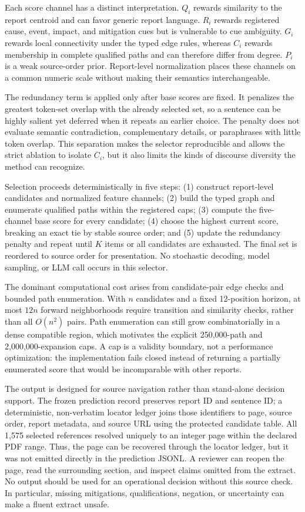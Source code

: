 \documentclass[applsci,article,submit,moreauthors]{Definitions/mdpi}
\begin{document}
Each score channel has a distinct interpretation. $Q_i$ rewards similarity to the report centroid and can favor generic report language. $R_i$ rewards registered cause, event, impact, and mitigation cues but is vulnerable to cue ambiguity. $G_i$ rewards local connectivity under the typed edge rules, whereas $C_i$ rewards membership in complete qualified paths and can therefore differ from degree. $P_i$ is a weak source-order prior. Report-level normalization places these channels on a common numeric scale without making their semantics interchangeable.

The redundancy term is applied only after base scores are fixed. It penalizes the greatest token-set overlap with the already selected set, so a sentence can be highly salient yet deferred when it repeats an earlier choice. The penalty does not evaluate semantic contradiction, complementary details, or paraphrases with little token overlap. This separation makes the selector reproducible and allows the strict ablation to isolate $C_i$, but it also limits the kinds of discourse diversity the method can recognize.

Selection proceeds deterministically in five steps: (1) construct report-level candidates and normalized feature channels; (2) build the typed graph and enumerate qualified paths within the registered caps; (3) compute the five-channel base score for every candidate; (4) choose the highest current score, breaking an exact tie by stable source order; and (5) update the redundancy penalty and repeat until $K$ items or all candidates are exhausted. The final set is reordered to source order for presentation. No stochastic decoding, model sampling, or LLM call occurs in this selector.

The dominant computational cost arises from candidate-pair edge checks and bounded path enumeration. With $n$ candidates and a fixed 12-position horizon, at most $12n$ forward neighborhoods require transition and similarity checks, rather than all $O(n^2)$ pairs. Path enumeration can still grow combinatorially in a dense compatible region, which motivates the explicit 250,000-path and 2,000,000-expansion caps. A cap is a validity boundary, not a performance optimization: the implementation fails closed instead of returning a partially enumerated score that would be incomparable with other reports.

The output is designed for source navigation rather than stand-alone decision support. The frozen prediction record preserves report ID and sentence ID; a deterministic, non-verbatim locator ledger joins those identifiers to page, source order, report metadata, and source URL using the protected candidate table. All 1,575 selected references resolved uniquely to an integer page within the declared PDF range. Thus, the page can be recovered through the locator ledger, but it was not emitted directly in the prediction JSONL. A reviewer can reopen the page, read the surrounding section, and inspect claims omitted from the extract. No output should be used for an operational decision without this source check. In particular, missing mitigations, qualifications, negation, or uncertainty can make a fluent extract unsafe.
\end{document}
